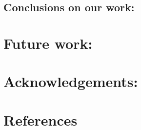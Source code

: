 \documentclass{article}
\begin{document}
\subsection{Conclusions on our work:}

\section{Future work:}

\section{Acknowledgements:}


\section{References}
\printbibliography
\end{document}
